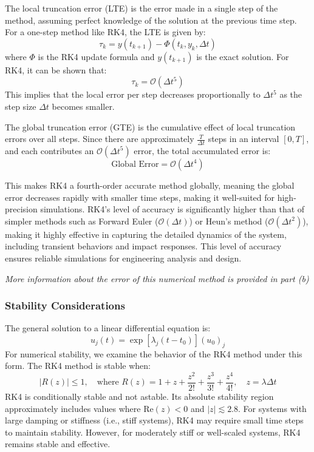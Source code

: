 \documentclass[12pt,letterpaper, onecolumn]{exam}
\begin{document}
\begin{questions}
\begin{solution}
\begin{parts}
The local truncation error (LTE) is the error made in a single step of the method, assuming perfect knowledge of the solution at the previous time step. For a one-step method like RK4, the LTE is given by:
\[
\tau_k = y(t_{k+1}) - \Phi(t_k, y_k, \Delta t)
\]
where \( \Phi \) is the RK4 update formula and \( y(t_{k+1}) \) is the exact solution. For RK4, it can be shown that:
\[
\tau_k = \mathcal{O}(\Delta t^5)
\]
This implies that the local error per step decreases proportionally to \( \Delta t^5 \) as the step size \( \Delta t \) becomes smaller.

The global truncation error (GTE) is the cumulative effect of local truncation errors over all steps. Since there are approximately \( \frac{T}{\Delta t} \) steps in an interval \( [0, T] \), and each contributes an \( \mathcal{O}(\Delta t^5) \) error, the total accumulated error is:
\[
\text{Global Error} = \mathcal{O}(\Delta t^4)
\]

This makes RK4 a fourth-order accurate method globally, meaning the global error decreases rapidly with smaller time steps, making it well-suited for high-precision simulations. RK4's level of accuracy is significantly higher than that of simpler methods such as Forward Euler (\( \mathcal{O}(\Delta t) \)) or Heun’s method (\( \mathcal{O}(\Delta t^2) \)), making it highly effective in capturing the detailed dynamics of the system, including transient behaviors and impact responses. This level of accuracy ensures reliable simulations for engineering analysis and design.

\textit{More information about the error of this numerical method is provided in part (b)}

\subsubsection*{Stability Considerations}

The general solution to a linear differential equation is:
\[
u_j(t) = \exp\left[\lambda_j(t - t_0)\right](u_0)_j
\]
For numerical stability, we examine the behavior of the RK4 method under this form. The RK4 method is stable when:
\[
|R(z)| \leq 1, \quad \text{where } R(z) = 1 + z + \frac{z^2}{2!} + \frac{z^3}{3!} + \frac{z^4}{4!}, \quad z = \lambda \Delta t
\]
RK4 is conditionally stable and not astable. Its absolute stability region approximately includes values where \( \text{Re}(z) < 0 \) and \( |z| \lesssim 2.8 \). For systems with large damping or stiffness (i.e., stiff systems), RK4 may require small time steps to maintain stability. However, for moderately stiff or well-scaled systems, RK4 remains stable and effective.


\end{parts}
\end{solution}
\end{questions}
\end{document}
